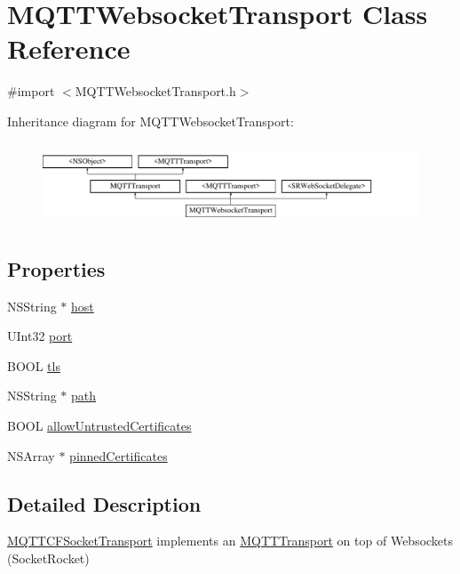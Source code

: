 \hypertarget{interface_m_q_t_t_websocket_transport}{}\section{M\+Q\+T\+T\+Websocket\+Transport Class Reference}
\label{interface_m_q_t_t_websocket_transport}


{\ttfamily \#import $<$M\+Q\+T\+T\+Websocket\+Transport.\+h$>$}

Inheritance diagram for M\+Q\+T\+T\+Websocket\+Transport\+:\begin{figure}[H]
\begin{center}
\leavevmode
\includegraphics[height=2.470588cm]{interface_m_q_t_t_websocket_transport}
\end{center}
\end{figure}
\subsection*{Properties}
\begin{DoxyCompactItemize}
\item 
N\+S\+String $\ast$ \hyperlink{interface_m_q_t_t_websocket_transport_a1e4c2c9fa31f833f46379dc57ca9536d}{host}
\item 
U\+Int32 \hyperlink{interface_m_q_t_t_websocket_transport_aed94b3a21446f3c4a45bbdae97095e31}{port}
\item 
B\+O\+OL \hyperlink{interface_m_q_t_t_websocket_transport_a028dce824b120b670e0759c994066ce0}{tls}
\item 
N\+S\+String $\ast$ \hyperlink{interface_m_q_t_t_websocket_transport_a9261bfd30cf1e8fa50de06f56f3c9c1b}{path}
\item 
B\+O\+OL \hyperlink{interface_m_q_t_t_websocket_transport_a4df39d1f59fd822446ed0630164475ae}{allow\+Untrusted\+Certificates}
\item 
N\+S\+Array $\ast$ \hyperlink{interface_m_q_t_t_websocket_transport_aaafe7397cd1c3e41240cd9752bcb446b}{pinned\+Certificates}
\end{DoxyCompactItemize}


\subsection{Detailed Description}
\hyperlink{interface_m_q_t_t_c_f_socket_transport}{M\+Q\+T\+T\+C\+F\+Socket\+Transport} implements an \hyperlink{interface_m_q_t_t_transport}{M\+Q\+T\+T\+Transport} on top of Websockets (Socket\+Rocket) 

